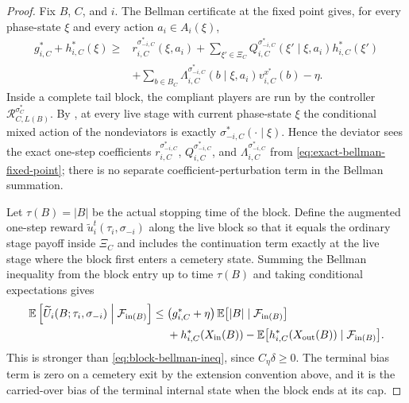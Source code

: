 \documentclass[12pt]{article}
\theoremstyle{definition}
\newcommand{\E}{\mathbb{E}}
\newcommand{\1}{\mathbf{1}}
\newcommand{\cF}{\mathcal{F}}
\begin{document}
\begin{proof}
Fix $B$, $C$, and $i$. The Bellman certificate at the fixed point gives, for every
phase-state $\xi$ and every action $a_i\in A_i(\xi)$,
\begin{align}
\label{eq:exact-bellman-fixed-point}
g_{i,C}^* + h_{i,C}^*(\xi)
\ge {}
&r_{i,C}^{\sigma_{-i,C}^*}(\xi,a_i)
+
\sum_{\xi'\in\Xi_C}Q_{i,C}^{\sigma_{-i,C}^*}(\xi'\mid\xi,a_i)h_{i,C}^*(\xi')
\\
&+
\sum_{b\in B_C}\Lambda_{i,C}^{\sigma_{-i,C}^*}(b\mid\xi,a_i)v_{i,C}^{x^*}(b)
-\eta.
\nonumber
\end{align}
Inside a complete tail block, the compliant players are run by the controller
$\mathcal R_{C,L(B)}^{\sigma_C^*}$. By , at every live
stage with current phase-state $\xi$ the conditional mixed action of the
nondeviators is exactly $\sigma_{-i,C}^*(\cdot\mid\xi)$. Hence the deviator sees
the exact one-step coefficients
$r_{i,C}^{\sigma_{-i,C}^*}$, $Q_{i,C}^{\sigma_{-i,C}^*}$, and
$\Lambda_{i,C}^{\sigma_{-i,C}^*}$ from
\eqref{eq:exact-bellman-fixed-point}; there is no separate coefficient-perturbation
term in the Bellman summation.

Let $\tau(B)=|B|$ be the actual stopping time of the block. Define the augmented
one-step reward $\widetilde u_i^t(\tau_i,\sigma_{-i})$ along the live block so that
it equals the ordinary stage payoff inside $\Xi_C$ and includes the continuation
term exactly at the live stage where the block first enters a cemetery state.
Summing the Bellman inequality from the block entry up to time $\tau(B)$ and
taking conditional expectations gives
\begin{align*}
\E\left[\widetilde U_i(B;\tau_i,\sigma_{-i})\Bigm|\cF_{\mathrm{in}(B)}\right]
\le{}&
\bigl(g_{i,C}^*+\eta\bigr)\,
\E\bigl[|B|\mid\cF_{\mathrm{in}(B)}\bigr]
\\
&+
h_{i,C}^*(X_{\mathrm{in}}(B))
-
\E\bigl[h_{i,C}^*(X_{\mathrm{out}}(B))\mid\cF_{\mathrm{in}(B)}\bigr].
\end{align*}
This is stronger than \eqref{eq:block-bellman-ineq}, since $C_\eta\delta\ge 0$.
The terminal bias term is zero on a cemetery exit by the extension convention above,
and it is the carried-over bias of the terminal internal state when the block ends
at its cap.
\end{proof}
\end{document}
